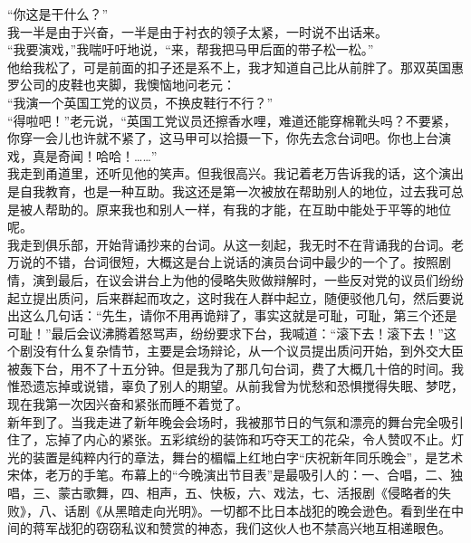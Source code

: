 “你这是干什么？”\\

我一半是由于兴奋，一半是由于衬衣的领子太紧，一时说不出话来。\\

“我要演戏，”我喘吁吁地说，“来，帮我把马甲后面的带子松一松。”\\

他给我松了，可是前面的扣子还是系不上，我才知道自己比从前胖了。那双英国惠罗公司的皮鞋也夹脚，我懊恼地问老元：\\

“我演一个英国工党的议员，不换皮鞋行不行？”\\

“得啦吧！”老元说，“英国工党议员还擦香水哩，难道还能穿棉靴头吗？不要紧，你穿一会儿也许就不紧了，这马甲可以拾摄一下，你先去念台词吧。你也上台演戏，真是奇闻！哈哈！……”\\

我走到甬道里，还听见他的笑声。但我很高兴。我记着老万告诉我的话，这个演出是自我教育，也是一种互助。我这还是第一次被放在帮助别人的地位，过去我可总是被人帮助的。原来我也和别人一样，有我的才能，在互助中能处于平等的地位呢。\\

我走到俱乐部，开始背诵抄来的台词。从这一刻起，我无时不在背诵我的台词。老万说的不错，台词很短，大概这是台上说话的演员台词中最少的一个了。按照剧情，演到最后，在议会讲台上为他的侵略失败做辩解时，一些反对党的议员们纷纷起立提出质问，后来群起而攻之，这时我在人群中起立，随便驳他几句，然后要说出这么几句话：“先生，请你不用再诡辩了，事实这就是可耻，可耻，第三个还是可耻！”最后会议沸腾着怒骂声，纷纷要求下台，我喊道：“滚下去！滚下去！”这个剧没有什么复杂情节，主要是会场辩论，从一个议员提出质问开始，到外交大臣被轰下台，用不了十五分钟。但是我为了那几句台词，费了大概几十倍的时间。我惟恐遗忘掉或说错，辜负了别人的期望。从前我曾为忧愁和恐惧搅得失眠、梦呓，现在我第一次因兴奋和紧张而睡不着觉了。\\

新年到了。当我走进了新年晚会会场时，我被那节日的气氛和漂亮的舞台完全吸引住了，忘掉了内心的紧张。五彩缤纷的装饰和巧夺天工的花朵，令人赞叹不止。灯光的装置是纯粹内行的章法，舞台的楣幅上红地白字“庆祝新年同乐晚会”，是艺术宋体，老万的手笔。布幕上的“今晚演出节目表”是最吸引人的：一、合唱，二、独唱，三、蒙古歌舞，四、相声，五、快板，六、戏法，七、活报剧《侵略者的失败》，八、话剧《从黑暗走向光明》。一切都不比日本战犯的晚会逊色。看到坐在中间的蒋军战犯的窃窃私议和赞赏的神态，我们这伙人也不禁高兴地互相递眼色。\\

